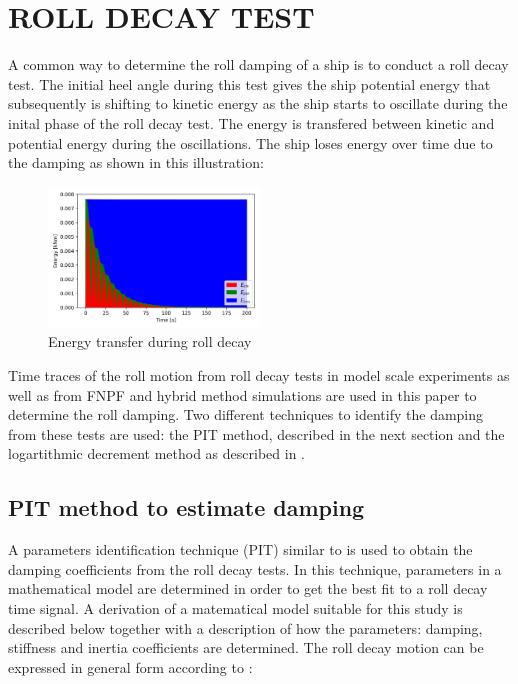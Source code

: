 \section*{ROLL DECAY TEST}\label{roll-decay-test}

    A common way to determine the roll damping of a ship is to conduct a
roll decay test. The initial heel angle during this test gives the ship
potential energy that subsequently is shifting to kinetic energy as the
ship starts to oscillate during the inital phase of the roll decay test.
The energy is transfered between kinetic and potential energy during the
oscillations. The ship loses energy over time due to the damping as
shown in this illustration:
 
            
    
    \begin{figure}[H]
        \begin{center}\includegraphics[width = 0.5\textwidth]{figures/energy.png}\end{center}
        \vspace{-1cm}
        \caption{Energy transfer during roll decay}
        \label{fig:energy}
    \end{figure}
    

    Time traces of the roll motion from roll decay tests in model scale
experiments as well as from FNPF and hybrid method simulations are used
in this paper to determine the roll damping. Two different techniques to
identify the damping from these tests are used: the PIT method,
described in the next section and the logartithmic decrement method as
described in \cite{7505983/BYNJ8CFG}.
    \subsection*{PIT method to estimate
damping}\label{pit-method-to-estimate-damping}

    A parameters identification technique (PIT) similar to
\cite{7505983/EXYJELCU} is used to obtain the damping coefficients from
the roll decay tests. In this technique, parameters in a mathematical
model are determined in order to get the best fit to a roll decay time
signal. A derivation of a matematical model suitable for this study is
described below together with a description of how the parameters:
damping, stiffness and inertia coefficients are determined. The roll
decay motion can be expressed in general form according to
\cite{7505983/FB64RGPF}:
 
